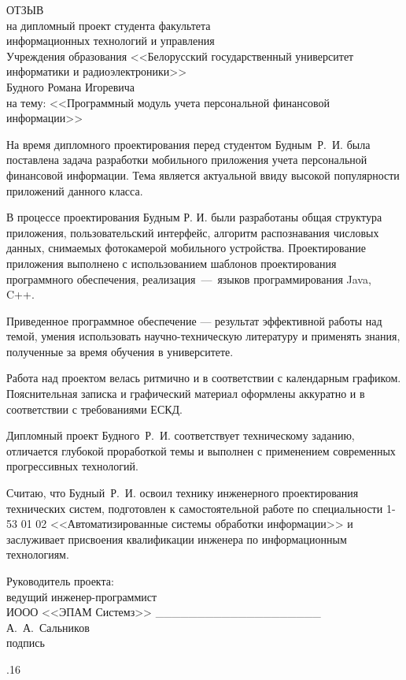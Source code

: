 \documentclass[a4paper,hidelinks,14pt]{extarticle}
\begin{document}
\thispagestyle{empty}

\begin{center}
  ОТЗЫВ \\
  на дипломный проект студента факультета \\
  информационных технологий и управления \\
  Учреждения образования <<Белорусский государственный университет
  информатики и радиоэлектроники>> \\
  Будного Романа Игоревича \\
  на тему: <<Программный модуль учета персональной финансовой информации>>
\end{center}

На время дипломного проектирования перед студентом Будным~Р.~И.
была поставлена задача разработки мобильного приложения учета персональной
финансовой информации. Тема является актуальной ввиду высокой популярности
приложений данного класса.

В процессе проектирования Будным Р. И. были разработаны общая структура приложения,
пользовательский интерфейс, алгоритм распознавания числовых данных,
снимаемых фотокамерой мобильного устройства.
Проектирование приложения выполнено с использованием шаблонов проектирования
программного обеспечения, реализация~---~языков программирования Java, C++.

Приведенное программное обеспечение --- результат эффективной работы над темой,
умения использовать научно-техническую литературу
и применять знания, полученные за время обучения в университете.

Работа над проектом велась ритмично и в соответствии с календарным графиком.
Пояснительная записка и графический материал оформлены аккуратно
и в соответствии с требованиями ЕСКД.

Дипломный проект Будного~Р.~И. соответствует техническому заданию,
отличается глубокой проработкой темы и выполнен с применением современных
прогрессивных технологий.

Считаю, что Будный~Р.~И. освоил технику инженерного проектирования
технических систем, подготовлен к самостоятельной работе по специальности 1-53 01 02
<<Автоматизированные системы обработки информации>> и заслуживает
присвоения квалификации инженера по информационным технологиям.

\bigskip
\noindent Руководитель проекта: \\
\noindent ведущий инженер-программист \\
\noindent ИООО <<ЭПАМ Системз>> \_\_\_\_\_\_\_\_\_\_\_\_\_\_\_\_\_\_\_\_ А.~А.~Сальников \\
\hspace*{7.4cm} {\small подпись}

.16
\end{document}

